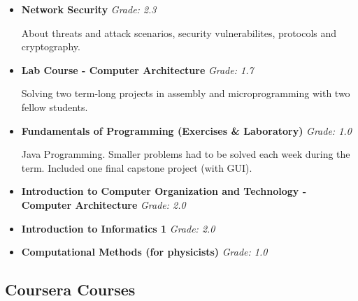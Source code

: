 \documentclass[11pt,a4paper,sans]{moderncv}        %
\begin{document}
\begin{itemize}
\item{\textbf{Network Security} \textit{Grade: 2.3}

\vspace{2pt}
\small{About threats and attack scenarios, security vulnerabilites, protocols and cryptography.}}

\vspace{2pt}

\item{\textbf{Lab Course - Computer Architecture} \textit{Grade: 1.7}

\vspace{2pt}

\small{Solving two term-long projects in assembly and microprogramming with two fellow students.}}

\item{\textbf{Fundamentals of Programming (Exercises \& Laboratory)} \textit{Grade: 1.0}

\vspace{2pt}
\small{Java Programming. Smaller problems had to be solved each week during the term. Included one final capstone project (with GUI).}}

\item{\textbf{Introduction to Computer Organization and Technology - Computer Architecture} \textit{Grade: 2.0}}

\item{\textbf{Introduction to Informatics 1} \textit{Grade: 2.0}}

\item{\textbf{Computational Methods (for physicists)} \textit{Grade: 1.0}}

\end{itemize}

\subsection{Coursera Courses}

\vspace{5pt}
\end{document}
